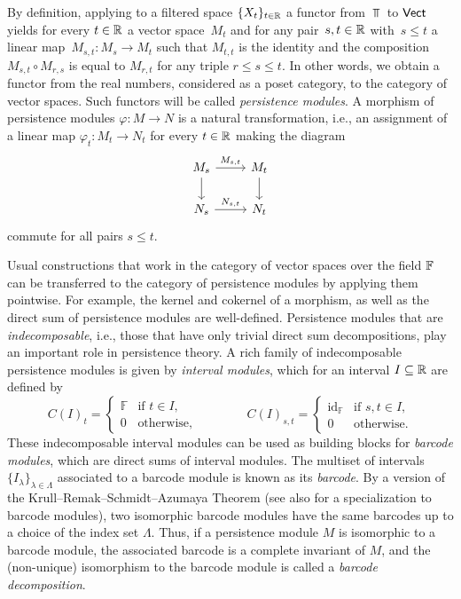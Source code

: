 By definition, applying to a filtered space $\{X_t\}_{t \in \mathbb{R}}$ a functor from $\Top$ to $\mathsf{Vect}$ yields for every $t \in \mathbb{R}$ a vector space~$M_t$ and for any pair~$s, t \in \mathbb{R}$ with~$s \leq t$ a linear map~$M_{s,t} \colon M_s \to M_t$ such that $M_{t,t}$ is the identity and the composition $M_{s,t} \circ M_{r,s}$ is equal to $M_{r,t}$ for any triple $r \leq s \leq t$.
In other words, we obtain a functor from the real numbers, considered as a poset category, to the category of vector spaces.
Such functors will be called \emph{persistence modules}.
A morphism of persistence modules $\varphi \colon M \to N$ is a natural transformation, i.e., an assignment of a linear map $\varphi_t \colon M_t \to N_t$ for every $t \in \mathbb{R}$ making the diagram
\begin{equation*}
    \begin{tikzcd}
    M_{s} \arrow[r, "M_{s,t}"] \arrow[d] & M_{t} \arrow[d] \\
    N_{s} \arrow[r, "N_{s,t}"] & N_{t}
    \end{tikzcd}
\end{equation*}
commute for all pairs $s \leq t$.

Usual constructions that work in the category of vector spaces over the field $\mathbb{F}$ can be transferred to the category of persistence modules by applying them pointwise.
For example, the kernel and cokernel of a morphism, as well as the direct sum of persistence modules are well-defined.
Persistence modules that are \emph{indecomposable}, i.e., those that have only trivial direct sum decompositions, play an important role in persistence theory.
A rich family of indecomposable persistence modules is given by \emph{interval modules}, which for an interval $I \subseteq \mathbb{R}$ are defined by
\begin{equation} \label{e:interval module}
    C(I)_t =
    \begin{cases}
        \mathbb{F} & \text{if } t \in I, \\
        0          & \text{otherwise},
    \end{cases}
    \qquad
    \qquad
    C(I)_{s, t} =
    \begin{cases}
        \operatorname{id}_{\mathbb{F}} & \text{if } s, t \in I,\\
        0 & \text{otherwise}.
    \end{cases}    
\end{equation}
These indecomposable interval modules can be used as building blocks for \emph{barcode modules}, which are direct sums of interval modules.
The multiset of intervals $\{I_{\lambda}\}_{\lambda \in \Lambda}$ associated to a barcode module is known as its \textit{barcode}. By a version of the Krull--Remak--Schmidt--Azumaya Theorem \cite{MR37832} (see also \cite[Theorem 2.7]{Chazal.2016a} for a specialization to barcode modules), two isomorphic barcode modules have the same barcodes up to a choice of the index set $\Lambda$. Thus, if a persistence module $M$ is isomorphic to a barcode module, the associated barcode is a complete invariant of $M$, and the (non-unique) isomorphism to the barcode module is called a \emph{barcode decomposition}.

